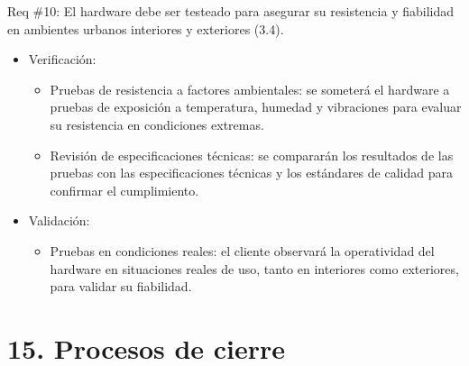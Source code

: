 \documentclass[
11pt, %
]{charter}
\begin{document}
\begin{itemize}
Req \#10: El hardware debe ser testeado para asegurar su resistencia y fiabilidad en ambientes urbanos interiores y exteriores (3.4).
\begin{itemize}
    \item Verificación:
    \begin{itemize}
        \item Pruebas de resistencia a factores ambientales: se someterá el hardware a pruebas de exposición a temperatura, humedad y vibraciones para evaluar su resistencia en condiciones extremas.
        \item Revisión de especificaciones técnicas: se compararán los resultados de las pruebas con las especificaciones técnicas y los estándares de calidad para confirmar el cumplimiento.
    \end{itemize}
    \item Validación:
    \begin{itemize}
        \item Pruebas en condiciones reales: el cliente observará la operatividad del hardware en situaciones reales de uso, tanto en interiores como exteriores, para validar su fiabilidad.
    \end{itemize}
\end{itemize}
\end{itemize}


\section{15. Procesos de cierre}    
\label{sec:cierre}


\end{document}
